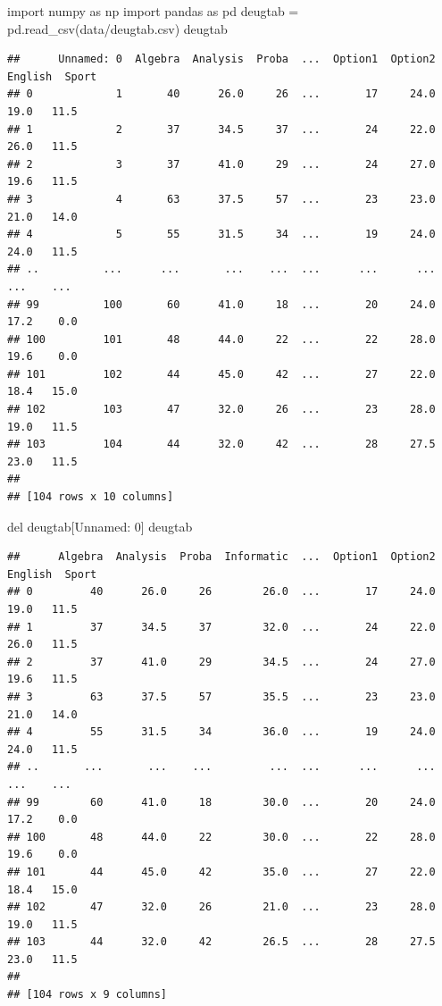 \documentclass[
  10pt,
]{article}
\newenvironment{Shaded}{\begin{snugshade}}{\end{snugshade}}
\newcommand{\NormalTok}[1]{#1}
\begin{document}
\begin{Shaded}
\begin{Highlighting}[]
\NormalTok{import numpy as np }
\NormalTok{import pandas as pd}
\NormalTok{deugtab = pd.read\_csv(\textquotesingle{}data/deugtab.csv\textquotesingle{})}
\NormalTok{deugtab}
\end{Highlighting}
\end{Shaded}

\begin{verbatim}
##      Unnamed: 0  Algebra  Analysis  Proba  ...  Option1  Option2  English  Sport
## 0             1       40      26.0     26  ...       17     24.0     19.0   11.5
## 1             2       37      34.5     37  ...       24     22.0     26.0   11.5
## 2             3       37      41.0     29  ...       24     27.0     19.6   11.5
## 3             4       63      37.5     57  ...       23     23.0     21.0   14.0
## 4             5       55      31.5     34  ...       19     24.0     24.0   11.5
## ..          ...      ...       ...    ...  ...      ...      ...      ...    ...
## 99          100       60      41.0     18  ...       20     24.0     17.2    0.0
## 100         101       48      44.0     22  ...       22     28.0     19.6    0.0
## 101         102       44      45.0     42  ...       27     22.0     18.4   15.0
## 102         103       47      32.0     26  ...       23     28.0     19.0   11.5
## 103         104       44      32.0     42  ...       28     27.5     23.0   11.5
## 
## [104 rows x 10 columns]
\end{verbatim}

\begin{Shaded}
\begin{Highlighting}[]
\NormalTok{del deugtab[\textquotesingle{}Unnamed: 0\textquotesingle{}]}
\NormalTok{deugtab}
\end{Highlighting}
\end{Shaded}

\begin{verbatim}
##      Algebra  Analysis  Proba  Informatic  ...  Option1  Option2  English  Sport
## 0         40      26.0     26        26.0  ...       17     24.0     19.0   11.5
## 1         37      34.5     37        32.0  ...       24     22.0     26.0   11.5
## 2         37      41.0     29        34.5  ...       24     27.0     19.6   11.5
## 3         63      37.5     57        35.5  ...       23     23.0     21.0   14.0
## 4         55      31.5     34        36.0  ...       19     24.0     24.0   11.5
## ..       ...       ...    ...         ...  ...      ...      ...      ...    ...
## 99        60      41.0     18        30.0  ...       20     24.0     17.2    0.0
## 100       48      44.0     22        30.0  ...       22     28.0     19.6    0.0
## 101       44      45.0     42        35.0  ...       27     22.0     18.4   15.0
## 102       47      32.0     26        21.0  ...       23     28.0     19.0   11.5
## 103       44      32.0     42        26.5  ...       28     27.5     23.0   11.5
## 
## [104 rows x 9 columns]
\end{verbatim}
\end{document}
